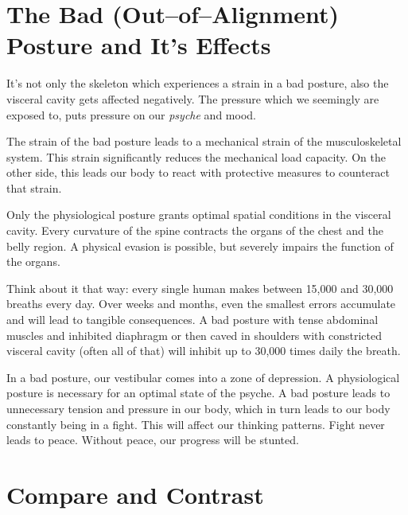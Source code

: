 \documentclass[../main.tex]{subfiles}
\begin{document}
\section[The Bad Posture and It's Effects]{The Bad (Out--of--Alignment) Posture and It's Effects}

It's not only the {skeleton} which experiences a strain in a bad posture, also the {visceral cavity} gets affected negatively.
The {pressure} which we seemingly are exposed to, puts pressure on our \emph{psyche} and mood.

The strain of the bad posture leads to a {mechanical strain} of the {musculoskeletal system}.
This strain significantly {reduces the mechanical load capacity}.
On the other side, this leads our body to react with {protective measures} to counteract that strain.

Only the physiological posture grants {optimal spatial conditions} in the visceral cavity.
Every curvature of the spine {contracts the organs} of the chest and the belly region.
A {physical evasion} is possible, but severely {impairs the function} of the organs.

Think about it that way: every single human makes between {15,000 and 30,000 breaths every day}.
Over weeks and months, even the smallest {errors accumulate} and will lead to tangible consequences.
A bad posture with {tense abdominal muscles} and {inhibited diaphragm} or then {caved in shoulders} with {constricted visceral cavity}
(often all of that) will inhibit up to 30,000 times daily the breath.

In a bad posture, our {vestibular} comes into a {zone of depression}.
A physiological posture is necessary for an optimal state of the psyche. 
A bad posture leads to {unnecessary tension and pressure} in our body, which in turn leads to our body constantly being in a {fight}.
This will affect our {thinking patterns}.
Fight never leads to peace.
Without peace, our progress will be stunted.

\newpage
\section{Compare and Contrast}
\end{document}
